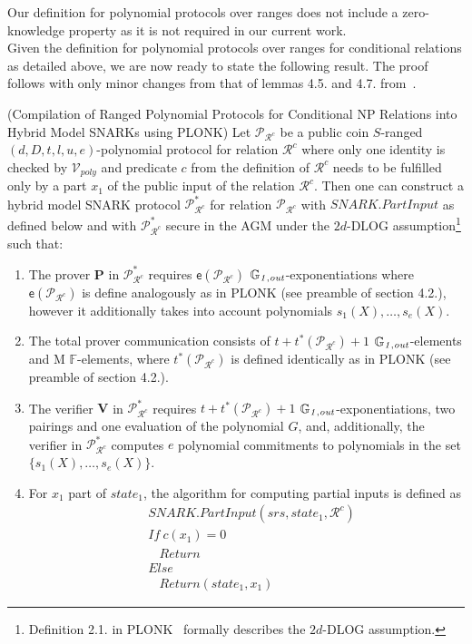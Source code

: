 \noindent Our definition for polynomial protocols over ranges does not include a zero-knowledge property as it is not required in our current work. \\

\noindent Given the definition for polynomial protocols over ranges for conditional relations as detailed above, we are now ready to state the following result.
The proof follows with only minor changes from that of lemmas 4.5. and 4.7. from~\cite{plonk}. 

\begin{lemma}(Compilation of Ranged Polynomial Protocols for Conditional NP Relations into Hybrid Model SNARKs using PLONK) 
\label{le:compilation_step_1}
Let $\mathscr{P}_{\mathcal{R}^c}$ be a public coin $S$-ranged $(d, D, t, l, u, e)$-polynomial protocol for relation $\mathcal{R}^c$ where only 
one identity is checked by $\mathcal{V}_{poly}$ and predicate $c$ from the definition of ${\mathcal{R}^c}$ needs to be fulfilled only by a part $x_1$ 
of the public input of the relation ${\mathcal{R}^c}$. Then one can construct a hybrid model SNARK protocol $\mathscr{P}^*_{\mathcal{R}^c}$ for relation 
$\mathscr{P}_{\mathcal{R}^c}$ with $\mathit{SNARK.PartInput}$ as defined below 
and with $\mathscr{P}^*_{\mathcal{R}^c}$ secure in the AGM under the $2d$-DLOG 
assumption\footnote{Definition 2.1. in PLONK~\cite{plonk} formally describes the $2d$-DLOG assumption.} such that:
\begin{enumerate}
\item The prover $\mathbf{P}$ in $\mathscr{P}^*_{\mathcal{R}^c}$ requires $\mathsf{e}(\mathscr{P}_{\mathcal{R}^c})$ $\mathbb{G}_{\mathit{1,out}}$-exponentiations where 
$\mathsf{e}(\mathscr{P}_{\mathcal{R}^c})$ is define analogously as in PLONK (see preamble of section 4.2.), however it additionally takes into account 
polynomials $s_1(X), \ldots, s_e(X)$. 
\item The total prover communication consists of $t + t^*(\mathscr{P}_{\mathcal{R}^c}) + 1$ $\mathbb{G}_{\mathit{1,out}}$-elements and M $\mathbb{F}$-elements, where 
$t^*(\mathscr{P}_{\mathcal{R}^c})$ is defined identically as in PLONK (see preamble of section 4.2.).
\item The verifier $\mathbf{V}$ in $\mathscr{P}^*_{\mathcal{R}^c}$ requires $t + t^*(\mathscr{P}_{\mathcal{R}^c})+1$ $\mathbb{G}_{\mathit{1,out}}$-exponentiations, 
two pairings and one evaluation of the polynomial $G$, and, additionally, the verifier in $\mathscr{P}^*_{\mathcal{R}^c}$ computes $e$ 
polynomial commitments to polynomials in the set $\{s_1(X), \ldots, s_e(X)\}$. 
\item For $x_1$ part of $\mathit{state_1}$, the algorithm for computing partial inputs is defined as 
\begin{align*}
&\mathit{SNARK.PartInput}(\mathit{srs}, \mathit{state_1}, \mathcal{R}^c) \\
&\mathit{If \ } c(x_1) = 0 \\
&\ \ \ \ \mathit{Return} \\
&\mathit{Else } \\
&\ \ \ \ \mathit{Return} (\mathit{state_1}, x_1)
\end{align*}
\end{enumerate}
\end{lemma}